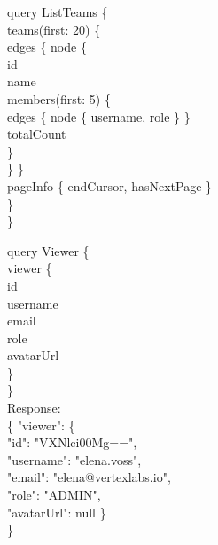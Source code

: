 \begin{minipage}{0.48\textwidth}
  \begin{querybox}[title=Query: List Teams]
query ListTeams \{\\
\quad teams(first: 20) \{\\
\qquad edges \{ node \{\\
\qquad\quad id\\
\qquad\quad name\\
\qquad\quad members(first: 5) \{\\
\qquad\qquad edges \{ node \{ username, role \} \}\\
\qquad\qquad totalCount\\
\qquad\quad \}\\
\qquad \} \}\\
\qquad pageInfo \{ endCursor, hasNextPage \}\\
\quad \}\\
\}
  \end{querybox}
\end{minipage}%
\hfill%
\begin{minipage}{0.48\textwidth}
  \begin{querybox}[title=Query: Current User]
query Viewer \{\\
\quad viewer \{\\
\qquad id\\
\qquad username\\
\qquad email\\
\qquad role\\
\qquad avatarUrl\\
\quad \}\\
\}\\[2pt]
Response:\\
\{ "viewer": \{\\
\quad "id": "VXNlci00Mg==",\\
\quad "username": "elena.voss",\\
\quad "email": "elena@vertexlabs.io",\\
\quad "role": "ADMIN",\\
\quad "avatarUrl": null \}\\
\}
  \end{querybox}
\end{minipage}
\par
